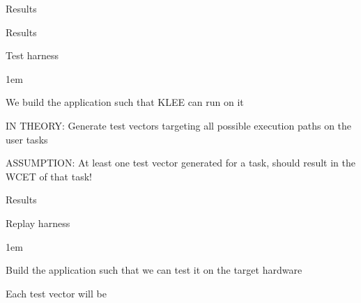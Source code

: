 \begin{frame}{Results}
        
\end{frame}

\begin{frame}{Results}
    \begin{block}{Test harness}
        \begin{itemize-size}{1em}
            \item We build the application such that KLEE can run on it
            \item IN THEORY: Generate test vectors targeting all possible
            execution paths on the user tasks
            \item ASSUMPTION: At least one test vector generated for a task, should
            result in the WCET of that task!
        \end{itemize-size}  
    \end{block}
\end{frame}

\begin{frame}{Results}
    \begin{block}{Replay harness}
        \begin{itemize-size}{1em}
            \item Build the application such that we can test it on the target hardware
            \item Each test vector will be 
        \end{itemize-size}  
    \end{block}
\end{frame}
